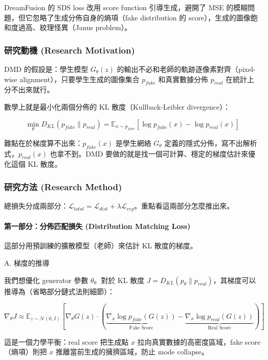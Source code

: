 DreamFusion 的 SDS loss 改用 score function 引導生成，避開了 MSE 的模糊問題，但它忽略了生成分佈自身的熵項（fake distribution 的 score），生成的圖像飽和度過高、紋理怪異（Janus problem）。

\subsubsection{研究動機 (Research Motivation)}

DMD 的假設是：學生模型 \(G_\theta(z)\) 的輸出不必和老師的軌跡逐像素對齊（pixel-wise alignment），只要學生生成的圖像集合 \(p_{fake}\) 和真實數據分佈 \(p_{real}\) 在統計上分不出來就行。

數學上就是最小化兩個分佈的 KL 散度（Kullback-Leibler divergence）：

\[
\min_\theta D_{KL}(p_{fake} \| p_{real}) = \mathbb{E}_{x \sim p_{fake}} \left[ \log p_{fake}(x) - \log p_{real}(x) \right]
\]

難點在於梯度算不出來：\(p_{fake}(x)\) 是學生網絡 \(G_\theta\) 定義的隱式分佈，寫不出解析式，\(p_{real}(x)\) 也拿不到。DMD 要做的就是找一個可計算、穩定的梯度估計來優化這個 KL 散度。

\subsubsection{研究方法 (Research Method)}

總損失分成兩部分：\(\mathcal{L}_{total} = \mathcal{L}_{dist} + \lambda \mathcal{L}_{reg}\)。重點看這兩部分怎麼推出來。

\paragraph{第一部分：分佈匹配損失 (Distribution Matching Loss)}

這部分用預訓練的擴散模型（老師）來估計 KL 散度的梯度。

A. 梯度的推導

我們想優化 generator 參數 \(\theta\)。對於 KL 散度 \(J = D_{KL}(p_\theta \| p_{real})\)，其梯度可以推導為（省略部分鏈式法則細節）：

\[
\nabla_\theta J \approx \mathbb{E}_{z \sim \mathcal{N}(0,I)} \left[ \nabla_\theta G(z) \cdot (\underbrace{\nabla_x \log p_{fake}(G(z))}_{\text{Fake Score}} - \underbrace{\nabla_x \log p_{real}(G(z))}_{\text{Real Score}}) \right]
\]

這是一個力學平衡：real score 把生成點 \(x\) 拉向真實數據的高密度區域，fake score（熵項）則把 \(x\) 推離當前生成的擁擠區域，防止 mode collapse。

